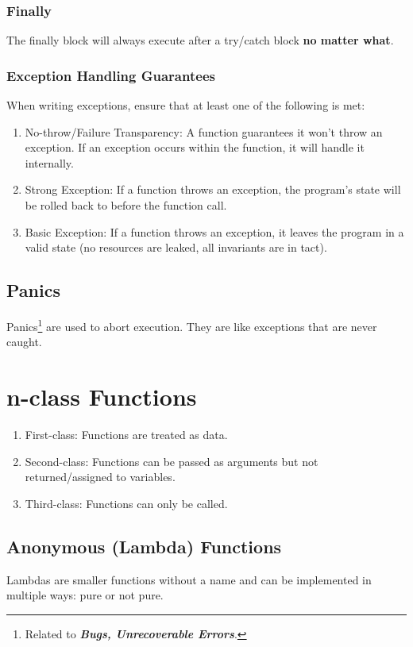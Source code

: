 \documentclass{article}
\begin{document}
\subsubsection{Finally} The finally block will always execute after a
try/catch block \textbf{no matter what}.
\subsubsection{Exception Handling Guarantees} When writing exceptions,
ensure that at least one of the following is met:
\begin{enumerate}[label=(\roman*)]
\item No-throw/Failure Transparency: A function guarantees it won't
  throw an exception. If an exception occurs within the function, it
  will handle it internally.
\item Strong Exception: If a function throws an exception, the
  program's state will be rolled back to before the function call.
\item Basic Exception: If a function throws an exception, it leaves
  the program in a valid state (no resources are leaked, all
  invariants are in tact).
\end{enumerate}

\subsection{Panics}
Panics\footnote{Related to \textit{\textbf{Bugs, Unrecoverable
      Errors}}.} are used to abort execution. They are like exceptions
that are never caught.





\section{n-class Functions}
\begin{enumerate}[label=(\roman*)]
\item First-class: Functions are treated as data.
\item Second-class: Functions can be passed as arguments but not
  returned/assigned to variables.
\item Third-class: Functions can only be called.
\end{enumerate}

\subsection{Anonymous (Lambda) Functions}
Lambdas are smaller functions without a name and can be implemented in
multiple ways: pure or not pure.
\end{document}

